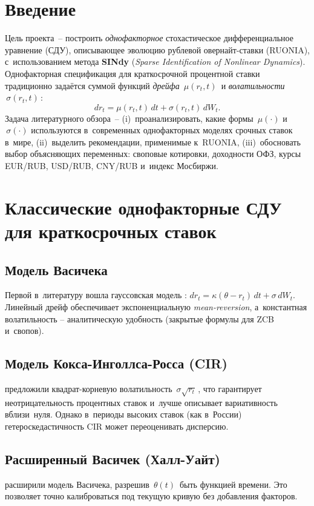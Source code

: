 \section{Введение}

Цель проекта -- построить \emph{однофакторное} стохастическое
дифференциальное уравнение (СДУ), описывающее эволюцию рублевой
овернайт-ставки (RUONIA), с использованием метода \textbf{SINdy}
(\emph{Sparse Identification of Nonlinear Dynamics}).  
Однофакторная спецификация для краткосрочной процентной ставки
традиционно задаётся суммой функций \emph{дрейфа}
$\,\mu(r_t,t)\,$ и \emph{волатильности} $\,\sigma(r_t,t)\,$:
\begin{equation}
  dr_t = \mu(r_t,t)\,dt + \sigma(r_t,t)\,dW_t.
\end{equation}
Задача литературного обзора -- (i) проанализировать,
какие формы $\,\mu(\cdot)$ и $\,\sigma(\cdot)$ используются в современных
однофакторных моделях срочных ставок в мире,  
(ii) выделить рекомендации, применимые к RUONIA,  
(iii) обосновать выбор объясняющих переменных:
своповые котировки, доходности ОФЗ, курсы EUR/RUB, USD/RUB, CNY/RUB
и индекс Мосбиржи.

\section{Классические однофакторные СДУ для краткосрочных ставок}

\subsection{Модель Васичека}
Первой в литературу вошла гауссовская
модель \cite{Vasicek1977}:
$dr_t = \kappa(\theta - r_t)\,dt + \sigma\,dW_t$.
Линейный дрейф обеспечивает
экспоненциальную \emph{mean-reversion},
а константная волатильность -- аналитическую
удобность (закрытые формулы для ZCB и свопов).

\subsection{Модель Кокса-Инголлса-Росса (CIR)}
\cite{CIR1985} предложили квадрат-корневую
волатильность $\,\sigma\sqrt{r_t}\,$,
что гарантирует неотрицательность процентных ставок
и лучше описывает вариативность вблизи нуля.
Однако в периоды высоких ставок (как в России)
гетероскедастичность CIR может переоценивать дисперсию.

\subsection{Расширенный Васичек (Халл-Уайт)}
\cite{HullWhite1990} расширили модель Васичека,
разрешив $\,\theta(t)\,$ быть функцией времени.
Это позволяет точно калиброваться под текущую кривую
без добавления факторов.

